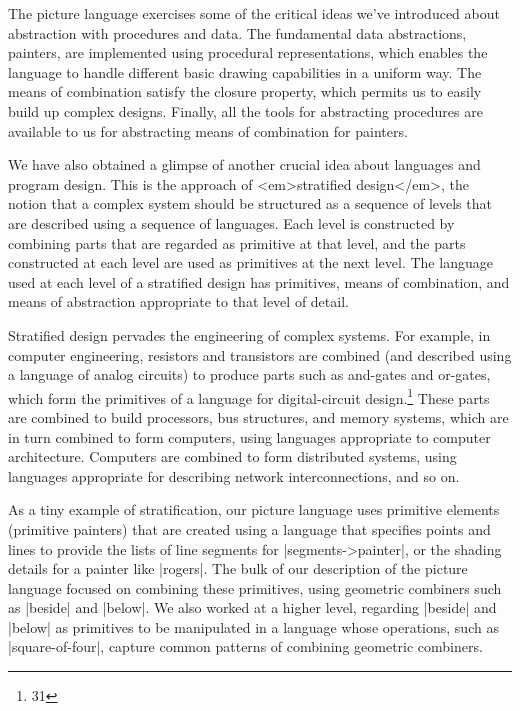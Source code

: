 \begin{Exercise}
\begin{Exercise}
\begin{Exercise}
\begin{Exercise}
\begin{Exercise}
\begin{Exercise}
\begin{Exercise}
\begin{Exercise}
\begin{Exercise}
\begin{Exercise}
\begin{Exercise}
The picture language exercises some of the critical ideas
we've introduced about abstraction with procedures and data.  The
fundamental data abstractions, painters, are implemented using
procedural representations, which enables the language to
handle different basic drawing capabilities in a uniform way.  The
means of combination satisfy the closure property, which permits us to
easily build up complex designs.  Finally, all the tools for
abstracting procedures are available to us for abstracting means of
combination for painters.


We have also obtained a glimpse of another crucial idea about
languages and program design.  This is the approach of <em>stratified
design</em>, the notion that a complex system should be structured as a
sequence of levels that are described using a sequence of languages.
Each level is constructed by combining parts that are regarded as
primitive at that level, and the parts constructed at each level are
used as primitives at the next level.  The language used at each level
of a stratified design has primitives, means of combination, and means
of abstraction appropriate to that level of detail.

Stratified design pervades the engineering of complex systems.  For
example, in computer engineering, resistors and transistors are
combined (and described using a language of analog circuits) to
produce parts such as and-gates and or-gates, which form the
primitives of a language for digital-circuit design.\footnote{31}
These parts are combined to build
processors, bus structures, and memory systems, which are in turn
combined to form computers, using languages appropriate to computer
architecture.  Computers are combined to form distributed systems,
using languages appropriate for describing network interconnections,
and so on.

As a tiny example of stratification, our picture language uses
primitive elements (primitive painters) that are created using a
language that specifies points and lines to provide the lists of line
segments for \scheme|segments->painter|, or the
shading details for a painter like \scheme|rogers|.  The bulk of our
description of the picture language focused on combining these
primitives, using geometric combiners such as \scheme|beside| and \scheme|below|.  We also worked at a higher level, regarding \scheme|beside| and
\scheme|below| as primitives to be manipulated in a language whose
operations, such as \scheme|square-of-four|, capture common patterns of
combining geometric combiners.


\end{Exercise}
\end{Exercise}
\end{Exercise}
\end{Exercise}
\end{Exercise}
\end{Exercise}
\end{Exercise}
\end{Exercise}
\end{Exercise}
\end{Exercise}
\end{Exercise}
